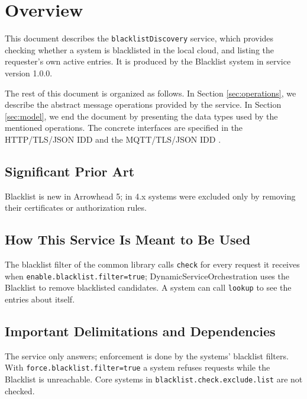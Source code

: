 \documentclass[a4paper]{arrowhead}
\begin{document}
\section{Overview}
\label{sec:overview}

This document describes the \texttt{blacklistDiscovery} service, which provides checking whether a system is blacklisted in the local cloud, and listing the requester's own active entries.
It is produced by the Blacklist system \cite{bl-sysd} in service version 1.0.0.

The rest of this document is organized as follows.
In Section \ref{sec:operations}, we describe the abstract message operations provided by the service.
In Section \ref{sec:model}, we end the document by presenting the data types used by the mentioned operations.
The concrete interfaces are specified in the HTTP/TLS/JSON IDD \cite{bl-blacklistDiscovery-http-idd} and the MQTT/TLS/JSON IDD \cite{bl-blacklistDiscovery-mqtt-idd}.

\subsection{Significant Prior Art}

Blacklist is new in Arrowhead 5; in 4.x systems were excluded only by removing their certificates or authorization rules.

\subsection{How This Service Is Meant to Be Used}

The blacklist filter of the common library calls \texttt{check} for every request it receives when \texttt{enable.\allowbreak{}blacklist.\allowbreak{}filter=\allowbreak{}true}; Dynamic\allowbreak{}Service\allowbreak{}Orchestration uses the Blacklist to remove blacklisted candidates. A system can call \texttt{lookup} to see the entries about itself.

\subsection{Important Delimitations and Dependencies}
\label{sec:delimitations}

The service only answers; enforcement is done by the systems' blacklist filters. With \texttt{force.\allowbreak{}blacklist.\allowbreak{}filter=\allowbreak{}true} a system refuses requests while the Blacklist is unreachable. Core systems in \texttt{blacklist.\allowbreak{}check.\allowbreak{}exclude.\allowbreak{}list} are not checked.
\end{document}

